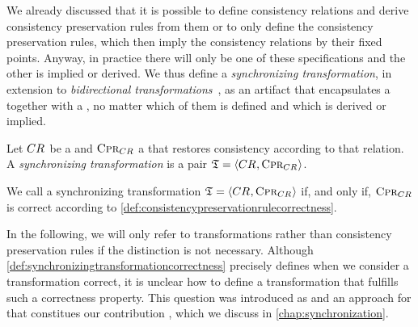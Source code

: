 
We already discussed that it is possible to define \glspl{consistency relation} and derive \glspl{consistency preservation rule} from them or to only define the \glspl{consistency preservation rule}, which then imply the \glspl{consistency relation} by their fixed points.
Anyway, in practice there will only be one of these specifications and the other is implied or derived.
We thus define a \emph{synchronizing transformation}, in extension to \emph{bidirectional transformations}~\cite{stevens2010sosym}, as an artifact that encapsulates a \modellevelconsistencyrelation together with a \modellevelconsistencypreservationrule, no matter which of them is defined and which is derived or implied.

\begin{definition}
    \label{def:synchronizingtransformation}
    Let $CR_{}$ be a \modellevelconsistencyrelation and $\textsc{Cpr}_{CR_{}}$ a \modellevelconsistencypreservationrule that restores consistency according to that relation.
    A \emph{synchronizing transformation} is a pair $\mathfrak{T} = \langle CR_{}, \textsc{Cpr}_{CR_{}} \rangle$.
\end{definition}

\begin{definition}
    \label{def:synchronizingtransformationcorrectness}
    We call a synchronizing transformation $\mathfrak{T} = \langle CR_{}, \textsc{Cpr}_{CR_{}} \rangle$ if, and only if, $\textsc{Cpr}_{CR_{}}$ is correct according to \autoref{def:consistencypreservationrulecorrectness}.
\end{definition}

In the following, we will only refer to transformations rather than \glspl{consistency preservation rule} if the distinction is not necessary.
Although \autoref{def:synchronizingtransformationcorrectness} precisely defines when we consider a transformation correct, it is unclear how to define a transformation that fulfills such a correctness property.
This question was introduced as  and an approach for that constitues our contribution , which we discuss in \autoref{chap:synchronization}.



